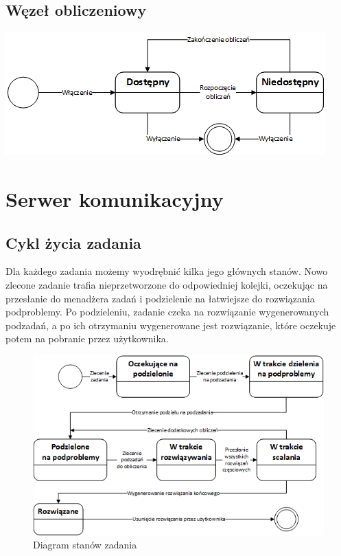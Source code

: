 \documentclass[12pt,a4paper,titlepage]{report}
\begin{document}
		\section{Węzeł obliczeniowy}
		\includegraphics[width=\textwidth]{img/state/ComputationalNode.png}

	\chapter{Serwer komunikacyjny}
	\section {Cykl życia zadania}

	Dla każdego zadania możemy wyodrębnić kilka jego głównych stanów. Nowo zlecone zadanie
	trafia nieprzetworzone do odpowiedniej kolejki, oczekując na przesłanie do menadżera zadań
	i podzielenie na łatwiejsze do rozwiązania podproblemy. Po podzieleniu, zadanie czeka na rozwiązanie
	wygenerowanych podzadań, a po ich otrzymaniu wygenerowane jest rozwiązanie, które oczekuje potem na
	pobranie przez użytkownika.
	
	\begin{figure}[h]
		\centering
		\includegraphics[width=\textwidth]{img/state/Task.png}
		\caption{Diagram stanów zadania}
	\end{figure}
	
\end{document}

